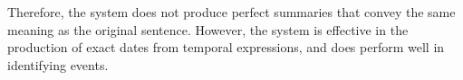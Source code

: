 \par Therefore, the system does not produce perfect summaries that convey the same meaning as the original sentence. However, the system is effective in the production of exact dates from temporal expressions, and does perform well in identifying events.


































